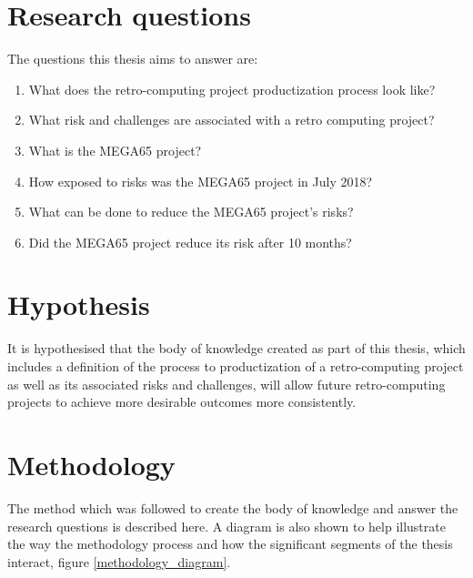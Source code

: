\section{Research questions}
The questions this thesis aims to answer are:
\begin{enumerate}
\item What does the retro-computing project productization process look like?
\item What risk and challenges are associated with a retro computing project?
\item What is the MEGA65 project? 
\item How exposed to risks was the MEGA65 project in July 2018?
\item What can be done to reduce the MEGA65 project's risks?
\item Did the MEGA65 project reduce its risk after 10 months?
\end{enumerate}

\section{Hypothesis}
\label{hypothesis}
It is hypothesised that the body of knowledge created as part of this thesis, which includes a definition of the process to productization of a retro-computing project as well as its associated risks and challenges, will allow future retro-computing projects to achieve more desirable outcomes more consistently.

\section{Methodology}
The method which was followed to create the body of knowledge and answer the research questions is described here. A diagram is also shown to help illustrate the way the methodology process and how the significant segments of the thesis interact, figure \ref{methodology_diagram}.

